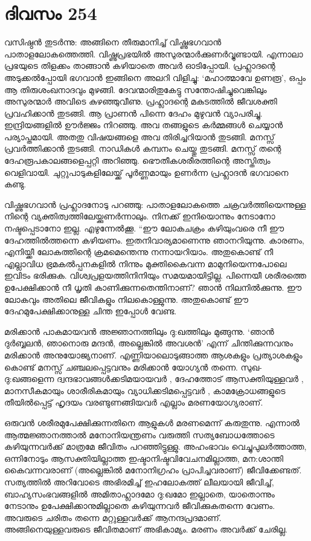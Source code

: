 \section{ദിവസം 254}


വസിഷ്ഠന്‍ തുടര്‍ന്നു: അങ്ങിനെ തീരുമാനിച്ച് വിഷ്ണുഭഗവാന്‍ പാതാളലോകത്തെത്തി. വിഷ്ണുപ്രഭയില്‍ അസുരന്മാര്‍ക്കുണര്‍വ്വുണ്ടായി. എന്നാലാ പ്രഭയുടെ തിളക്കം താങ്ങാന്‍ കഴിയാതെ അവര്‍ ഓടിപ്പോയി. പ്രഹ്ലാദന്റെ അടുക്കല്‍പ്പോയി ഭഗവാന്‍ ഇങ്ങിനെ അലറി വിളിച്ചു: ‘മഹാത്മാവേ ഉണരൂ’, ഒപ്പം ആ തിരുശംഖനാദവും മുഴങ്ങി. ദേവന്മാരിതുകേട്ടു സന്തോഷിച്ചുവെങ്കിലും അസുരന്മാര്‍ അവിടെ കുഴഞ്ഞുവീണു. പ്രഹ്ലാദന്റെ മകുടത്തില്‍ ജീവശക്തി പ്രവഹിക്കാന്‍ തുടങ്ങി. ആ പ്രാണന്‍ പിന്നെ ദേഹം മുഴുവന്‍ വ്യാപരിച്ചു. ഇന്ദ്രിയങ്ങളില്‍ ഊര്‍ജ്ജം നിറഞ്ഞു. അവ തങ്ങളുടെ കര്‍മ്മങ്ങള്‍ ചെയ്യാന്‍ പര്യാപ്തമായി. അതതു വിഷയങ്ങളെ അവ തിരിച്ചറിയാന്‍ തുടങ്ങി. മനസ്സ് പ്രവര്‍ത്തിക്കാന്‍ തുടങ്ങി. നാഡികള്‍ കമ്പനം ചെയ്തു തുടങ്ങി. മനസ്സ് തന്റെ ദേഹരൂപകാലങ്ങളെപ്പറ്റി അറിഞ്ഞു. ഭൌതീകശരീരത്തിന്റെ അസ്തിത്വം വെളിവായി. ചുറ്റുപാടുകളിലേയ്ക്ക് പൂര്‍ണ്ണമായും ഉണര്‍ന്ന പ്രഹ്ലാദന്‍ ഭഗവാനെ കണ്ടു.  

വിഷ്ണുഭഗവാന്‍ പ്രഹ്ലാദനോടു പറഞ്ഞു: പാതാളലോകത്തെ ചക്രവര്‍ത്തിയെന്നുള്ള നിന്റെ വ്യക്തിത്വത്തിലേയ്ക്കുണര്‍ന്നാലും. നിനക്ക് ഇനിയൊന്നും നേടാനോ നഷ്ടപ്പെടാനോ ഇല്ല. എഴുന്നേല്‍ക്കൂ. “ഈ ലോകചക്രം കഴിയുംവരെ നീ ഈ ദേഹത്തില്‍ത്തന്നെ കഴിയണം. ഇതനിവാര്യമാണെന്നു ഞാനറിയുന്നു. കാരണം, എനിയ്ക്കീ ലോകത്തിന്റെ ക്രമമെന്തെന്നു നന്നായറിയാം. അതുകൊണ്ട് നീ എല്ലാവിധ ഭ്രമകല്‍പ്പനകളില്‍ നിന്നും മുക്തികൈവന്ന മാമുനിയെന്നപോലെ ഇവിടം ഭരിക്കുക. വിശ്വപ്രളയത്തിനിനിയും സമയമായിട്ടില്ല. പിന്നെയീ ശരീരത്തെ ഉപേക്ഷിക്കാന്‍ നീ ധൃതി കാണിക്കുന്നതെന്തിനാണ്? ഞാന്‍ നിലനില്‍ക്കുന്നു. ഈ ലോകവും അതിലെ ജീവികളും നിലകൊള്ളുന്നു. അതുകൊണ്ട് ഈ ദേഹമുപേക്ഷിക്കാനുള്ള ചിന്ത ഇപ്പോള്‍ വേണ്ട.

മരിക്കാന്‍ പാകമായവന്‍ അജ്ഞാനത്തിലും ദു:ഖത്തിലും മുങ്ങുന്നു. ‘ഞാന്‍ ദുര്‍ബ്ബലന്‍, ഞാനൊരു മന്ദന്‍, അല്ലെങ്കില്‍ അവശന്‍’ എന്ന് ചിന്തിക്കുന്നവനും മരിക്കാന്‍ അനുയോജ്യനാണ്. എണ്ണിയാലൊടുങ്ങാത്ത ആശകളും പ്രത്യാശകളും കൊണ്ട് മനസ്സ് ചഞ്ചലപ്പെട്ടവനും മരിക്കാന്‍ യോഗ്യന്‍ തന്നെ. സുഖ-ദു:ഖങ്ങളെന്ന ദ്വന്ദഭാവങ്ങള്‍ക്കടിമയായവര്‍ , ദേഹത്തോട് ആസക്തിയുള്ളവര്‍ , മാനസീകമായും ശാരീരികമായും വ്യാധിക്കടിമപ്പെട്ടവര്‍ , കാമക്രോധങ്ങളുടെ തീയില്‍പ്പെട്ട് ഹൃദയം വരണ്ടുണങ്ങിയവര്‍ എല്ലാം മരണയോഗ്യരാണ്. 

ഒരുവന്‍ ശരീരമുപേക്ഷിക്കുന്നതിനെ ആളുകള്‍ മരണമെന്ന് കരുതുന്നു. എന്നാല്‍ ആത്മജ്ഞാനത്താല്‍ മനോനിയന്ത്രണം വരുത്തി സത്യബോധത്തോടെ കഴിയുന്നവര്‍ക്ക് മാത്രമേ ജീവിതം പറഞ്ഞിട്ടുള്ളു.  അഹംഭാവം വെച്ചുപുലര്‍ത്താത്ത, ഒന്നിനോടും ആസക്തിയില്ലാത്ത ഇഷ്ടാനിഷ്ടവിവേചനമില്ലാത്ത, മന:ശാന്തി കൈവന്നവരാണ് (അല്ലെങ്കില്‍ മനോനിഗ്രഹം പ്രാപിച്ചവരാണ്) ജീവിക്കേണ്ടത്. സത്യത്തില്‍ അറിവോടെ അഭിരമിച്ച് ഇഹലോകത്ത് ലീലയായി ജീവിച്ച്, ബാഹ്യസംഭവങ്ങളില്‍ അമിതാഹ്ലാദമോ ദു:ഖമോ ഇല്ലാതെ, യാതൊന്നും നേടാനും ഉപേക്ഷിക്കാനുമില്ലാതെ കഴിയുന്നവര്‍ ജീവിക്കുകതന്നെ വേണം. അവരുടെ ചരിതം തന്നെ മറ്റുള്ളവര്‍ക്ക് ആനന്ദപ്രദമാണ്. അങ്ങിനെയുള്ളവരുടെ ജീവിതമാണ് അഭികാമ്യം. മരണം അവര്‍ക്ക് ചേരില്ല.
